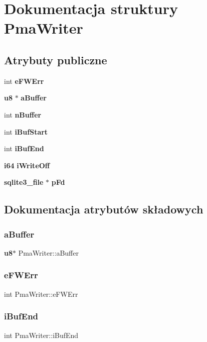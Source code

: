 \section{Dokumentacja struktury Pma\+Writer}
\label{struct_pma_writer}
\subsection*{Atrybuty publiczne}
\begin{DoxyCompactItemize}
\item 
int \textbf{ e\+F\+W\+Err}
\item 
\textbf{ u8} $\ast$ \textbf{ a\+Buffer}
\item 
int \textbf{ n\+Buffer}
\item 
int \textbf{ i\+Buf\+Start}
\item 
int \textbf{ i\+Buf\+End}
\item 
\textbf{ i64} \textbf{ i\+Write\+Off}
\item 
\textbf{ sqlite3\+\_\+file} $\ast$ \textbf{ p\+Fd}
\end{DoxyCompactItemize}


\subsection{Dokumentacja atrybutów składowych}
\mbox{\label{struct_pma_writer_ae53ada27501eb89a45409db4776f3b23}} 
\subsubsection{aBuffer}
{\footnotesize\ttfamily \textbf{ u8}$\ast$ Pma\+Writer\+::a\+Buffer}

\mbox{\label{struct_pma_writer_a3d74aff37c8abafd22ec8f8159d08725}} 
\subsubsection{eFWErr}
{\footnotesize\ttfamily int Pma\+Writer\+::e\+F\+W\+Err}

\mbox{\label{struct_pma_writer_ab15d816e53fb4496dd1e59094d4839a6}} 
\subsubsection{iBufEnd}
{\footnotesize\ttfamily int Pma\+Writer\+::i\+Buf\+End}


